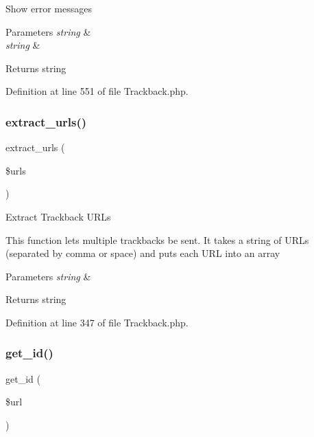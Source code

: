 Show error messages


\begin{DoxyParams}{Parameters}
{\em string} & \\
\hline
{\em string} & \\
\hline
\end{DoxyParams}
\begin{DoxyReturn}{Returns}
string 
\end{DoxyReturn}


Definition at line 551 of file Trackback.\+php.

\mbox{\label{class_c_i___trackback_aab29f333201544b83e318dd761ac797a}} 
\subsubsection{\texorpdfstring{extract\_urls()}{extract\_urls()}}
{\footnotesize\ttfamily extract\+\_\+urls (\begin{DoxyParamCaption}\item[{}]{\$urls }\end{DoxyParamCaption})}

Extract Trackback U\+R\+Ls

This function lets multiple trackbacks be sent. It takes a string of U\+R\+Ls (separated by comma or space) and puts each U\+RL into an array


\begin{DoxyParams}{Parameters}
{\em string} & \\
\hline
\end{DoxyParams}
\begin{DoxyReturn}{Returns}
string 
\end{DoxyReturn}


Definition at line 347 of file Trackback.\+php.

\mbox{\label{class_c_i___trackback_a404e345e61e00d5685117a101b5bc71a}} 
\subsubsection{\texorpdfstring{get\_id()}{get\_id()}}
{\footnotesize\ttfamily get\+\_\+id (\begin{DoxyParamCaption}\item[{}]{\$url }\end{DoxyParamCaption})}

